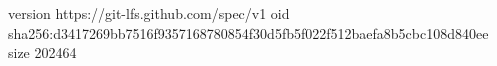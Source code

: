 version https://git-lfs.github.com/spec/v1
oid sha256:d3417269bb7516f9357168780854f30d5fb5f022f512baefa8b5cbc108d840ee
size 202464
